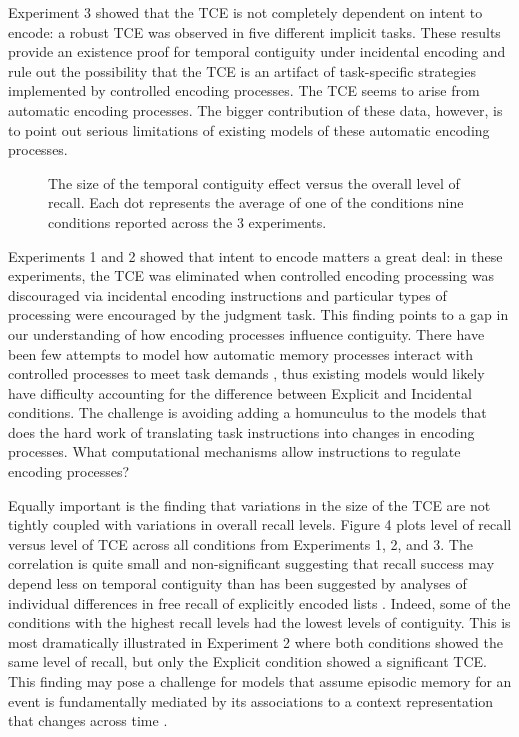 \documentclass[jou,natbib,floatsintext]{apa6} %
\begin{document}
Experiment 3 showed that the TCE is not completely dependent on intent to encode: a robust TCE was observed in five different implicit tasks. These results provide an existence proof for temporal contiguity under incidental encoding and rule out the possibility that the TCE is an artifact of task-specific strategies implemented by controlled encoding processes. The TCE seems to arise from automatic encoding processes. The bigger contribution of these data, however, is to point out serious limitations of existing models of these automatic encoding processes. 


\begin{figure}%
\caption{The size of the temporal contiguity effect versus the overall level of recall. Each dot represents the average of one of the conditions nine conditions reported across the 3 experiments.}
\label{corr}
\end{figure}

Experiments 1 and 2 showed that intent to encode matters a great deal: in these experiments, the TCE was eliminated when controlled encoding processing was discouraged via incidental encoding instructions and particular types of processing were encouraged by the judgment task. This finding points to a gap in our understanding of how encoding processes influence contiguity. There have been few attempts to model how automatic memory processes interact with controlled processes to meet task demands \citep{LehmMalm13,PolyEtal09}, thus existing models would likely have difficulty accounting for the difference between Explicit and Incidental conditions. The challenge is avoiding adding a homunculus to the models that does the hard work of translating task instructions into changes in encoding processes. What computational mechanisms allow instructions to regulate encoding processes?

Equally important is the finding that variations in the size of the TCE are not tightly coupled with variations in overall recall levels. Figure 4 plots level of recall versus level of TCE across all conditions from Experiments 1, 2, and 3. \label{done-12} \color{red} The correlation is quite small and non-significant \color{black} suggesting that recall success may depend less on temporal contiguity than has been suggested by analyses of individual differences in free recall of explicitly encoded lists \citep{SedeEtal10,HealEtal14}. Indeed, some of the conditions with the highest recall levels had the lowest levels of contiguity. This is most dramatically illustrated in Experiment 2 where both conditions showed the same level of recall, but only the Explicit condition showed a significant TCE. This finding may pose a challenge for models that assume episodic memory for an event is fundamentally mediated by its associations to a context representation that changes across time \citep[e.g.,][]{LohnEtal14,HealKaha15}. 
\end{document}
